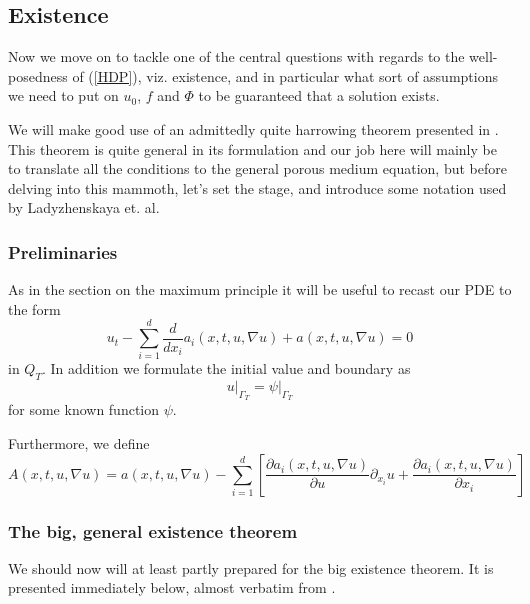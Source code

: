 \documentclass[11pt, a4paper]{article}
\begin{document}
\subsection{Existence}
Now we move on to tackle one of the central questions with regards to the well-posedness of (\ref{HDP}), viz. existence, and in particular what sort of assumptions we need to put on $u_0$, $f$ and $\Phi$ to be guaranteed that a solution exists.

We will make good use of an admittedly quite harrowing theorem presented in \citep{ladyzhenskaya}. This theorem is quite general in its formulation and our job here will mainly be to translate all the conditions to the general porous medium equation, but before delving into this mammoth, let's set the stage, and introduce some notation used by Ladyzhenskaya et. al.

\subsubsection{Preliminaries}

As in the section on the maximum principle it will be useful to recast our PDE to the form
\begin{equation}
\label{lady_parabolic_eq}
	u_t - \sum_{i=1}^d\frac{d}{dx_i}a_i(x,t,u,\nabla u) + a(x,t,u,\nabla u) = 0
\end{equation}
in $Q_T$. In addition we formulate the initial value and boundary as
\begin{equation}
\label{lady_bc}
	u\big|_{\Gamma_T} = \psi\big|_{\Gamma_T}
\end{equation}
for some known function $\psi$.

Furthermore, we define
\begin{equation*}
A(x,t,u,\nabla u) = a(x,t,u,\nabla u) - \sum_{i=1}^d \left[ \frac{\partial a_i(x,t,u,\nabla u)}{\partial u}\partial_{x_i}u + \frac{\partial a_i(x,t,u,\nabla u)}{\partial x_i} \right]
\end{equation*}


\subsubsection{The big, general existence theorem}
We should now will at least partly prepared for the big existence theorem. It is presented immediately below, almost verbatim from \citep[ Theorem 6.1, p. 452]{ladyzhenskaya}.
\end{document}

